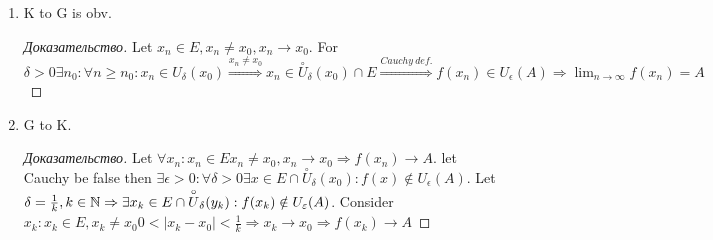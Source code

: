 \begin{theorem}[iff]
	\begin{enumerate}
		\item K to G is obv.
			\begin{proof}[Доказательство]
				Let $x_n \in E, x_n \neq x_0, x_n \to x_0$. For $\delta > 0 \exists n_0: \forall n \geq n_0: x_n \in U_\delta(x_0) \overset{x_n \neq x_0} \Rightarrow x_n \in \overset{\circ} U_\delta(x_0) \cap E \overset{Cauchy \ def.} \Rightarrow f(x_n) \in U_\epsilon(A) \Rightarrow \lim_{n \to \infty} f(x_n) = A$
			\end{proof}
		\item G to K.
			\begin{proof}[Доказательство]
				Let $\forall x_n: x_n \in E x_n \neq x_0, x_n \to x_0 \Rightarrow f(x_n) \to A$. let Cauchy be false then $\exists \epsilon > 0: \forall \delta > 0 \exists x \in E \cap \overset{\circ} U_\delta (x_0): f(x) \notin U_\epsilon(A)$. Let $\delta = \frac{1}{k}, k \in \mathbb{N} \Rightarrow \exists x_k \in E \cap \overset{\circ} U_\delta(y_k): f(x_k) \notin U_{\varepsilon}(A)$. Consider $x_k: x_k \in E, x_k \neq x_0 0 < \left| x_k - x_0 \right| < \frac{1}{k} \Rightarrow x_k \to x_0 \Rightarrow f(x_k) \to A$
			\end{proof}
	\end{enumerate}
\end{theorem}
